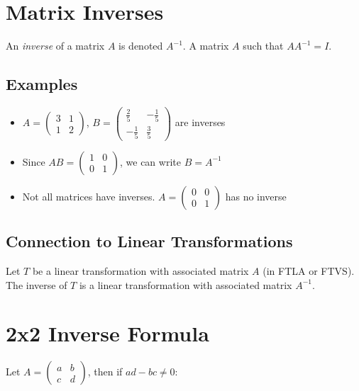 \documentclass[12pt,a4paper]{article}
\begin{document}
\section{Matrix Inverses}

An \textit{inverse} of a matrix $A$ is denoted $A^{-1}$. A matrix $A$ such that $AA^{-1} = I$.

\subsection{Examples}

\begin{itemize}
    \item $A = \begin{pmatrix} 3 & 1 \\ 1 & 2 \end{pmatrix}$, $B = \begin{pmatrix} \frac{2}{5} & -\frac{1}{5} \\ -\frac{1}{5} & \frac{3}{5} \end{pmatrix}$ are inverses
    \item Since $AB = \begin{pmatrix} 1 & 0 \\ 0 & 1 \end{pmatrix}$, we can write $B = A^{-1}$
    \item Not all matrices have inverses. $A = \begin{pmatrix} 0 & 0 \\ 0 & 1 \end{pmatrix}$ has no inverse
\end{itemize}

\subsection{Connection to Linear Transformations}

Let $T$ be a linear transformation with associated matrix $A$ (in FTLA or FTVS). The inverse of $T$ is a linear transformation with associated matrix $A^{-1}$.

\section{2x2 Inverse Formula}

Let $A = \begin{pmatrix} a & b \\ c & d \end{pmatrix}$, then if $ad-bc \neq 0$:
\end{document}
